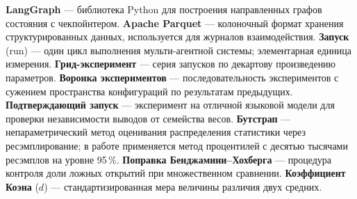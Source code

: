 \noindent\textbf{LangGraph} --- библиотека Python для построения
направленных графов состояния с чекпойнтером.\quad
\textbf{Apache Parquet} --- колоночный формат хранения
структурированных данных, используется для журналов
взаимодействия.\quad
\textbf{Запуск} (run) --- один цикл выполнения мульти-агентной
системы; элементарная единица измерения.\quad
\textbf{Грид-эксперимент} --- серия запусков по декартову
произведению параметров.\quad
\textbf{Воронка экспериментов} --- последовательность экспериментов
с сужением пространства конфигураций по результатам предыдущих.\quad
\textbf{Подтверждающий запуск} --- эксперимент на отличной
языковой модели для проверки независимости выводов от
семейства весов.\quad
\textbf{Бутстрап} --- непараметрический метод оценивания
распределения статистики через ресэмплирование; в работе
применяется метод процентилей с десятью тысячами ресэмплов на
уровне 95\,\%.\quad
\textbf{Поправка Бенджамини--Хохберга} --- процедура контроля
доли ложных открытий при множественном сравнении.\quad
\textbf{Коэффициент Коэна} ($d$) --- стандартизированная мера
величины различия двух средних.

\endgroup
